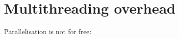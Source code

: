 \section{Multithreading overhead}
\label{section:node-level:overhead}

Parallelisation is not for free: 